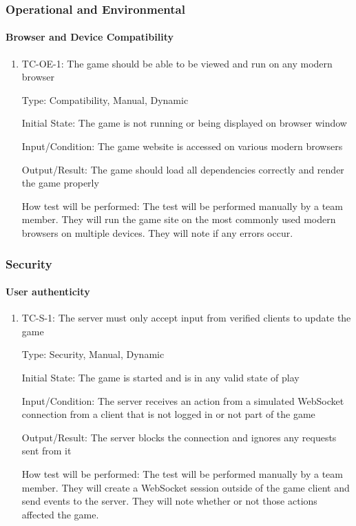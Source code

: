\documentclass[12pt, titlepage]{article}
\begin{document}
\subsubsection{Operational and Environmental}

\paragraph{Browser and Device Compatibility}

\begin{enumerate}

\item{TC-OE-1: The game should be able to be viewed and run on any modern browser}

Type: Compatibility, Manual, Dynamic
					
Initial State: The game is not running or being displayed on browser window
					
Input/Condition: The game website is accessed on various modern browsers
					
Output/Result: The game should load all dependencies correctly and render the game properly
					
How test will be performed: The test will be performed manually by a team member. They will run the game site on the most commonly used modern browsers on multiple devices. They will note if any errors occur.

\end{enumerate}

\subsubsection{Security}

\paragraph{User authenticity}

\begin{enumerate}
\item{TC-S-1: The server must only accept input from verified clients to update the game}

Type: Security, Manual, Dynamic
					
Initial State: The game is started and is in any valid state of play
					
Input/Condition: The server receives an action from a simulated WebSocket connection from a client that is not logged in or not part of the game
					
Output/Result: The server blocks the connection and ignores any requests sent from it
					
How test will be performed: The test will be performed manually by a team member. They will create a WebSocket session outside of the game client and send events to the server. They will note whether or not those actions affected the game.
\end{enumerate}
\end{document}

